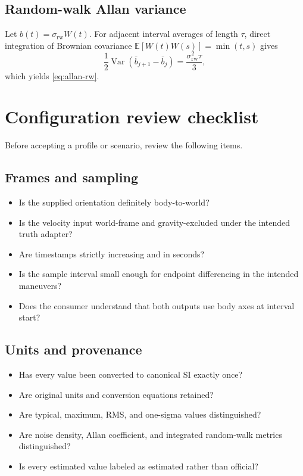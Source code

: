 \documentclass[11pt,oneside,headings=big]{scrreprt}
\newcommand{\E}{\mathbb{E}}
\newcommand{\Var}{\operatorname{Var}}
\begin{document}
    \section{Random-walk Allan variance}
    Let \(b(t)=\sigma_{\mathrm{rw}}W(t)\). For adjacent interval averages of length
    \(\tau\), direct integration of Brownian covariance
    \(\E[W(t)W(s)]=\min(t,s)\) gives
    \begin{equation}
        \frac12\Var(\bar b_{j+1}-\bar b_j)
        =\frac{\sigma_{\mathrm{rw}}^2\tau}{3},
    \end{equation}
    which yields \cref{eq:allan-rw}.


    \chapter{Configuration review checklist}
    \label{app:checklist}

    Before accepting a profile or scenario, review the following items.


    \section*{Frames and sampling}
    \begin{itemize}
        \item Is the supplied orientation definitely body-to-world?
        \item Is the velocity input world-frame and gravity-excluded under the intended
        truth adapter?
        \item Are timestamps strictly increasing and in seconds?
        \item Is the sample interval small enough for endpoint differencing in the
        intended maneuvers?
        \item Does the consumer understand that both outputs use body axes at interval
        start?
    \end{itemize}


    \section*{Units and provenance}
    \begin{itemize}
        \item Has every value been converted to canonical SI exactly once?
        \item Are original units and conversion equations retained?
        \item Are typical, maximum, RMS, and one-sigma values distinguished?
        \item Are noise density, Allan coefficient, and integrated random-walk metrics
        distinguished?
        \item Is every estimated value labeled as estimated rather than official?
    \end{itemize}
\end{document}

